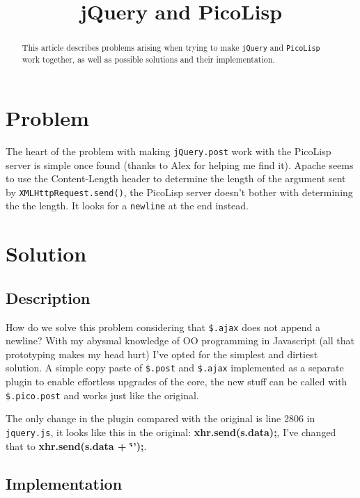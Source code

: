 \title{jQuery and PicoLisp}

\maketitle

\begin{abstract}
  This article describes problems arising when trying to make
  \texttt{jQuery} and \texttt{PicoLisp} work together, as well as
  possible solutions and their implementation. 
\end{abstract}

\section{Problem}
\label{sec:jquery-picolisp}

The heart of the problem with making \texttt{jQuery.post} work with
the PicoLisp server is simple once found (thanks to Alex for helping
me find it). Apache seems to use the Content-Length header to
determine the length of the argument sent by
\texttt{XMLHttpRequest.send()}, the PicoLisp server doesn't bother with
determining the the length. It looks for a \texttt{newline} at the end instead.

\section{Solution}
\label{sec:dsf}

\subsection{Description}
\label{sec:ds}

How do we solve this problem considering that \texttt{\$.ajax} does
not append a newline? With my abysmal knowledge of OO programming in
Javascript (all that prototyping makes my head hurt) I've opted for
the simplest and dirtiest solution. A simple copy paste of
\texttt{\$.post} and \texttt{\$.ajax} implemented as a separate plugin
to enable effortless upgrades of the core, the new stuff can be called
with \texttt{\$.pico.post} and works just like the original.

The only change in the plugin compared with the original is line 2806
in \texttt{jquery.js}, it looks like this in the original:
\textbf{xhr.send(s.data);}, I've changed that to
\textbf{xhr.send(s.data + `\r\n');}.

\subsection{Implementation}
\label{sec:dfs}

